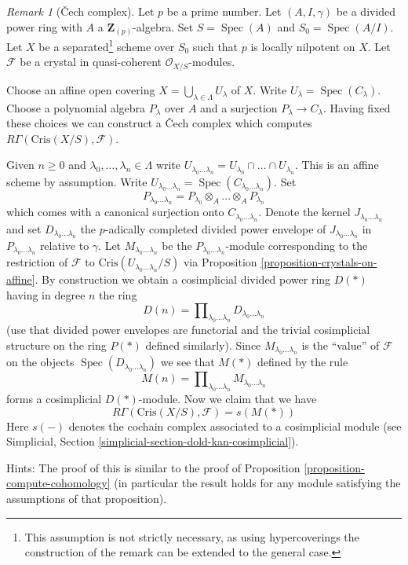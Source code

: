 \documentclass{stacks-project}
\theoremstyle{plain}
\theoremstyle{definition}
\theoremstyle{remark}
\newtheorem{remark}[subsection]{Remark}
\numberwithin{equation}{subsection}
\def\Spec{\mathop{\mathrm{Spec}}}
\begin{document}
\begin{remark}[{\v C}ech complex]
\label{remark-cech-complex}
Let $p$ be a prime number. Let $(A, I, \gamma)$ be a divided power
ring with $A$ a $\mathbf{Z}_{(p)}$-algebra. Set $S = \Spec(A)$ and
$S_0 = \Spec(A/I)$. Let $X$ be a separated\footnote{This assumption is
not strictly necessary, as using hypercoverings the construction of the
remark can be extended to the general case.} scheme over
$S_0$ such that $p$ is locally nilpotent on $X$. Let $\mathcal{F}$ be a
crystal in quasi-coherent $\mathcal{O}_{X/S}$-modules.

\medskip\noindent
Choose an affine open covering
$X = \bigcup_{\lambda \in \Lambda} U_\lambda$ of $X$.
Write $U_\lambda = \Spec(C_\lambda)$. Choose a polynomial algebra
$P_\lambda$ over $A$ and a surjection $P_\lambda \to C_\lambda$.
Having fixed these choices we can construct a {\v C}ech complex which
computes $R\Gamma(\text{Cris}(X/S), \mathcal{F})$.

\medskip\noindent
Given $n \geq 0$ and $\lambda_0, \ldots, \lambda_n \in \Lambda$
write $U_{\lambda_0 \ldots \lambda_n} = U_{\lambda_0} \cap \ldots
\cap U_{\lambda_n}$. This is an affine scheme by assumption. Write
$U_{\lambda_0 \ldots \lambda_n} = \Spec(C_{\lambda_0 \ldots \lambda_n})$.
Set
$$
P_{\lambda_0 \ldots \lambda_n} =
P_{\lambda_0} \otimes_A \ldots \otimes_A P_{\lambda_n}
$$
which comes with a canonical surjection onto $C_{\lambda_0 \ldots \lambda_n}$.
Denote the kernel $J_{\lambda_0 \ldots \lambda_n}$ and set
$D_{\lambda_0 \ldots \lambda_n}$
the $p$-adically completed divided power envelope of
$J_{\lambda_0 \ldots \lambda_n}$ in $P_{\lambda_0 \ldots \lambda_n}$
relative to $\gamma$. Let $M_{\lambda_0 \ldots \lambda_n}$ be the
$P_{\lambda_0 \ldots \lambda_n}$-module corresponding
to the restriction of $\mathcal{F}$ to
$\text{Cris}(U_{\lambda_0 \ldots \lambda_n}/S)$ via
Proposition \ref{proposition-crystals-on-affine}.
By construction we obtain a cosimplicial divided power ring $D(*)$
having in degree $n$ the ring
$$
D(n) =
\prod\nolimits_{\lambda_0 \ldots \lambda_n}
D_{\lambda_0 \ldots \lambda_n}
$$
(use that divided power envelopes are functorial and the trivial
cosimplicial structure on the ring $P(*)$ defined similarly).
Since $M_{\lambda_0 \ldots \lambda_n}$ is the ``value'' of $\mathcal{F}$
on the objects $\Spec(D_{\lambda_0 \ldots \lambda_n})$ we see that
$M(*)$ defined by the rule
$$
M(n) = \prod\nolimits_{\lambda_0 \ldots \lambda_n}
M_{\lambda_0 \ldots \lambda_n}
$$
forms a cosimplicial $D(*)$-module. Now we claim that we have
$$
R\Gamma(\text{Cris}(X/S), \mathcal{F}) = s(M(*))
$$
Here $s(-)$ denotes the cochain complex associated to a cosimplicial
module (see
Simplicial, Section \ref{simplicial-section-dold-kan-cosimplicial}).

\medskip\noindent
Hints: The proof of this is similar to the proof of
Proposition \ref{proposition-compute-cohomology} (in particular
the result holds for any module satisfying the assumptions of
that proposition).
\end{remark}
\end{document}

